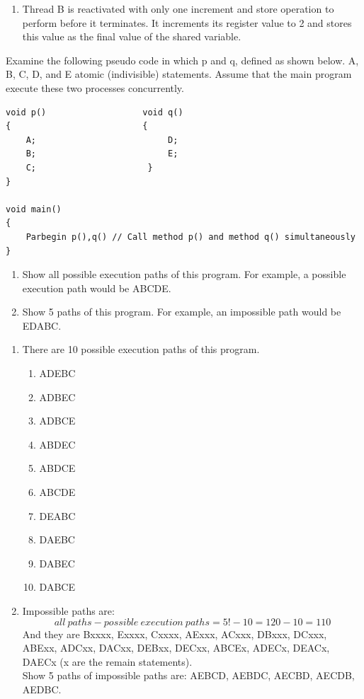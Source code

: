 \documentclass[12pt]{article}
\newenvironment{sol}[1][Solution]{\begin{trivlist}\item[\hskip\labelsep {\bfseries #1:}]}{\end{trivlist}}
\begin{document}
\begin{enumerate}
{\begin{enumerate}
    \item[(6)] Thread B is reactivated with only one increment and store operation to perform before it terminates. It increments its register value to 2 and stores this value as the final value of the shared variable.
\end{enumerate}
}
\newpage
\item Examine the following pseudo code in which p and q, defined as shown below. A, B, C, D, and E atomic (indivisible) statements. Assume that the main program execute these two processes concurrently.
 \begin{verbatim}
void p()                   void q()
{                          {
    A;                          D;
    B;                          E;
    C;                      }
}

void main()
{
    Parbegin p(),q() // Call method p() and method q() simultaneously
}
\end{verbatim}
\begin{enumerate}
    \item Show all possible execution paths of this program. For example, a possible execution path would be ABCDE.
    \item Show 5 paths of this program. For example, an impossible path would be EDABC.
\end{enumerate}
\begin{sol}
\hspace*{\fill} 
\begin{enumerate}
\item There are 10 possible execution paths of this program.
\begin{enumerate}
    \item ADEBC
    \item ADBEC
    \item ADBCE
    \item ABDEC
    \item ABDCE
    \item ABCDE
    \item DEABC
    \item DAEBC
    \item DABEC
    \item DABCE
    
\end{enumerate}
\item Impossible paths are: 
$$all \ paths - possible \ execution \ paths = 5! - 10 = 120 - 10 = 110$$
And they are Bxxxx, Exxxx, Cxxxx, AExxx, ACxxx, DBxxx, DCxxx, ABExx, ADCxx, DACxx, DEBxx, DECxx, ABCEx, ADECx, DEACx, DAECx (x are the remain statements).\\ Show 5 paths of impossible paths are: AEBCD, AEBDC, AECBD, AECDB, AEDBC.
\end{enumerate}


\end{sol}
\end{enumerate}
\end{document}
